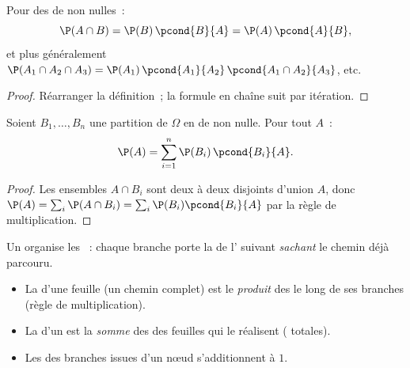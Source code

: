 \begin{proposition}\label{prop:g12:condprob:product}
Pour des  de  non nulles~:
\[
\P(A \cap B) = \P(B)\,\pcond{B}{A} = \P(A)\,\pcond{A}{B},
\]
et plus généralement
$\P(A_1 \cap A_2 \cap A_3) = \P(A_1)\,\pcond{A_1}{A_2}\,
\pcond{A_1 \cap A_2}{A_3}$, etc.
\end{proposition}

\begin{proof}
Réarranger la définition~; la formule en chaîne suit par itération.
\end{proof}

\begin{theorem}\label{thm:g12:condprob:total}
Soient $B_1, \dots, B_n$ une partition de $\Omega$ en  de
 non nulle. Pour tout  $A$~:
\[
\P(A) = \sum_{i=1}^{n} \P(B_i)\,\pcond{B_i}{A}.
\]
\end{theorem}

\begin{proof}
Les ensembles $A \cap B_i$ sont deux à deux disjoints d'union $A$, donc
$\P(A) = \sum_i \P(A \cap B_i) = \sum_i \P(B_i)\pcond{B_i}{A}$ par la règle
de multiplication.
\end{proof}

\begin{method}\label{met:g12:condprob:tree}
Un  organise les ~: chaque branche porte
la  de l' suivant \emph{sachant} le chemin déjà parcouru.
\begin{itemize}
  \item La  d'une feuille (un chemin complet) est le
        \emph{produit} des  le long de ses branches (règle de
        multiplication).
  \item La  d'un  est la \emph{somme} des 
        des feuilles qui le réalisent ( totales).
  \item Les  des branches issues d'un nœud s'additionnent à $1$.
\end{itemize}
\end{method}

